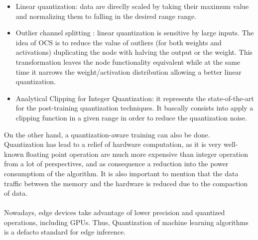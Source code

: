 \begin{itemize}
\item Linear quantization: data are direclly scaled by taking their maximum value and normalizing them to falling in the desired range range. 
\item Outlier channel splitting\cite{paper:46} : linear quantization is sensitive by large inputs. The idea of OCS is to reduce the value of outliers (for both weights and activations) duplicating the node with halving the output or the weight. This transformation leaves the node functionality equivalent while at the same time it narrows the weight/activation distribution allowing a better linear quantization.
\item Analytical Clipping for Integer Quantization\cite{paper:47}: it represents the state-of-the-art for the post-training quantization techniques. It bascally consists into apply a clipping function in a given range in order to reduce the quantization noise.
\end{itemize}

On the other hand, a quantization-aware training can also be done\cite{paper:45}.\\
Quantization has lead to a relief of hardware computation, as it is very well-known floating point operation are much more expensive than integer operation from a lot of perspectives, and as consequence a reduction into the power consumptiom of the algorithm. It is also important to mention that the data traffic between the memory and the hardware is reduced due to the compaction of data.\\\\

Nowadays, edge devices take advantage of lower precision and quantized operations, including GPUs. Thus, Quantization of machine learning algorithms is a defacto standard for edge inference.

